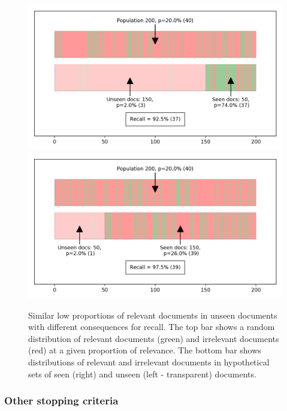 \documentclass{bmcart}
\begin{document}
\begin{figure}
	\includegraphics[width=\linewidth]{../images/proportions_1.png}
	\includegraphics[width=\linewidth]{../images/proportions_2.png}
	\caption{Similar low proportions of relevant documents in unseen documents with different consequences for recall. The top bar shows a random distribution of relevant documents (green) and irrelevant documents (red) at a given proportion of relevance. The bottom bar  shows distributions of relevant and irrelevant documents in hypothetical sets of seen (right) and unseen (left - transparent) documents.}
	\label{unseen-proportions}
\end{figure}

\subsubsection*{Other stopping criteria}
\end{document}
